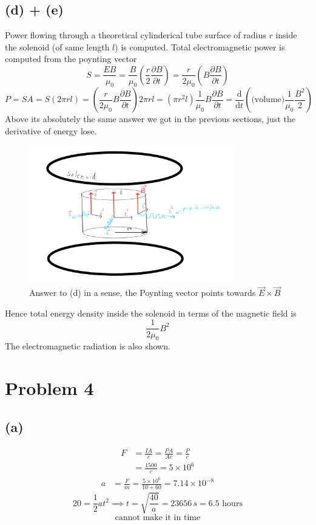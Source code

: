 \documentclass[a4paper]{article}
\begin{document}
\subsection*{(d) + (e)} 
Power flowing through a theoretical cylinderical tube surface of radius $r$ inside the solenoid (of same length $l$) is computed. 
Total electromagnetic power is computed from the poynting vector
\[
S = \frac{EB}{\mu_0} = \frac{B}{\mu_0} \left( \frac{r}{2} \frac{\partial B}{\partial t}\right) = 
\frac{r}{2 \mu_0} \left(B \frac{\partial B}{\partial t}\right)
\] 
\[
	P = S A = S (2 \pi r l) = \left(\frac{r}{2 \mu_0} B \frac{\partial B}{\partial t} \right) 2 \pi r l = ( \pi r^2 l ) \frac{1}{\mu_0} B \frac{\partial B}{\partial t} = 
	\frac{\mathrm{d} }{\mathrm{d} t} \left(\text{(volume)} \frac{1}{\mu_0} \frac{B^2}{2}\right)
\]
Above its absolutely the same answer we got in the previous sections, just the derivative of energy lose. 
\begin{figure}[H]
	\centering
	\includegraphics[width=0.8\textwidth]{./ss/7/1.png}
	\caption{Answer to  (d) in a sense, the Poynting vector points towards $\vec{E} \times  \vec{B}$}
	\label{fig:-ss-7-1-png}
\end{figure}
Hence total energy density inside the solenoid in terms of the magnetic field is 
\[
\frac{1}{2 \mu_0} B^2 
\] 
The electromagnetic radiation is also shown. 


\section*{Problem 4} 
\subsection*{(a)} 
\begin{align*}
	F &=  \frac{IA}{c} = \frac{PA}{A c} = \frac{P}{c}  \\
	&= \frac{1500}{c} = 5 \times 10^{6} 
\end{align*}
\begin{align*}
	a &= \frac{F}{m} = \frac{5 \times  10^{6}}{10 + 60} = 7.14 \times 10^{-8} 
\end{align*}
\[
20 = \frac{1}{2}at^2 \implies t = \sqrt{\frac{40}{a}}  = 23656 \, s  = 6.5 \text{ hours}
\] 
\[
\text{cannot make it in time}
\] 
\end{document}

